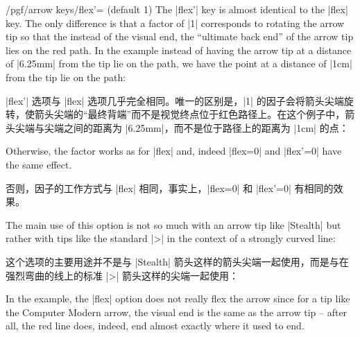 \begin{key}{/pgf/arrow keys/flex'= (default 1)}
    The |flex'| key is almost identical to the |flex| key. The only difference
    is that a factor of |1| corresponds to rotating the arrow tip so that the
    instead of the visual end, the ``ultimate back end'' of the arrow tip lies
    on the red path. In the example instead of having the arrow tip at a
    distance of |6.25mm| from the tip lie on the path, we have the point at a
    distance of |1cm| from the tip lie on the path:
    
    |flex'| 选项与 |flex| 选项几乎完全相同。唯一的区别是，|1| 的因子会将箭头尖端旋转，使箭头尖端的“最终背端”而不是视觉终点位于红色路径上。在这个例子中，箭头尖端与尖端之间的距离为 |6.25mm|，而不是位于路径上的距离为 |1cm| 的点：
\begin{codeexample}[preamble={\usetikzlibrary{arrows.meta,bending}}]
\end{codeexample}
    Otherwise, the factor works as for |flex| and, indeed |flex=0| and
    |flex'=0| have the same effect.

    否则，因子的工作方式与 |flex| 相同，事实上，|flex=0| 和 |flex'=0| 有相同的效果。

    The main use of this option is not so much with an arrow tip like |Stealth|
    but rather with tips like the standard |>| in the context of a strongly
    curved line:
    
    这个选项的主要用途并不是与 |Stealth| 箭头这样的箭头尖端一起使用，而是与在强烈弯曲的线上的标准 |>| 箭头这样的尖端一起使用：

\begin{codeexample}[preamble={\usetikzlibrary{arrows.meta,bending}}]
\end{codeexample}
    In the example, the |flex| option does not really flex the arrow since for
    a tip like the Computer Modern arrow, the visual end is the same as the
    arrow tip -- after all, the red line does, indeed, end almost exactly where
    it used to end.


\end{key}
